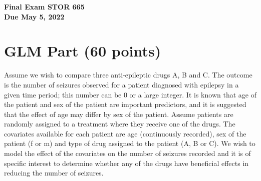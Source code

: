 \documentclass[11pt]{article}
\newcommand{\0}{{\mathbf{0}}}
\newcommand{\1}{{\mathbf{1}}}
\begin{document}
\begin{title}
{\Large\bf Final Exam STOR 665\\
 Due May 5, 2022}
\end{title}

\author{Student Name: Minji Kim}

\date{\today}
\maketitle


\begin{abstract}
\noindent
\begin{itemize}
  \item Edit this {\LaTeX} file with your solutions and generate a PDF file from it.  Upload a {\bf zip} folder that contains {\bf the tex, the pdf, the py (or the .ipynb), the .csv} file to Sakai. 
  \item If you use Jupyter Notebook to generate results for the data analysis part, please combine the PDF output with the PDF of theory part.
  \item You are {\bf NOT} allowed to work with other students. Identical solutions will receive a $\0$ in grade and will be investigated.
\end{itemize}
\end{abstract}



\section{GLM Part (60 points)}

Assume we wish to compare three anti-epileptic drugs A, B and C. The outcome is the number of seizures observed for a patient diagnosed with epilepsy in a given time period; this number can be $0$ or a large integer. It is known that age of the patient and sex of the patient are important predictors, and it is suggested that the effect of age may differ by sex of the patient. Assume patients are randomly assigned to a treatment where they receive one of the drugs. The covariates available for each patient are age (continuously recorded), sex of the patient (f or m) and type of drug assigned to the patient (A, B or C). We wish to model the effect of the covariates on the number of seizures recorded and it is of specific interest to determine whether any of the drugs have beneficial effects in reducing the number of seizures.
\end{document}
